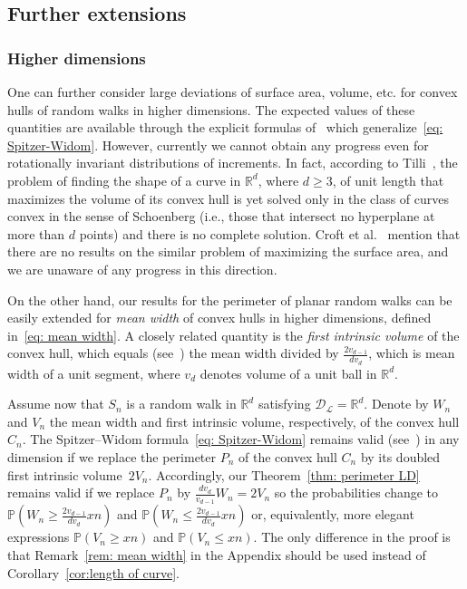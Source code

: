 \documentclass[AHL,Unicode,published]{cedram}
\newcommand{\Rbb}{\mathbb{R}}
\newcommand{\Pbb}{\mathbb{P}}
\newcommand{\Dcl}{\mathcal{D}}
\newcommand{\Lcl}{\mathcal{L}}
\begin{document}
\subsection{Further extensions} \label{sec: further}
\subsubsection{Higher dimensions}

One can further consider large deviations of surface area, volume, etc. for convex hulls of random walks in higher dimensions. The expected values of these quantities are available through the explicit formulas of~\cite[Section~4]{VysotskyZaporozhets} which generalize~\eqref{eq: Spitzer-Widom}. However, currently we cannot obtain any progress even for rotationally invariant distributions of increments. In fact, according to Tilli~\cite{Tilli}, the problem of finding the shape of a curve in $\Rbb^d$, where $d \ge 3$, of unit length that maximizes the volume of its convex hull is yet solved only in the class of curves convex in the sense of Schoenberg (i.e., those that intersect no hyperplane at more than $d$ points) and there is no complete solution. Croft et al.~\cite[Problem A28]{Croft+} mention that there are no results on the similar problem of maximizing the surface area, and we are unaware of any progress in this direction.

\begin{rema}\label{rem: thm mean width}
On the other hand, our results for the perimeter of planar random walks can be easily extended for \emph{mean width} of convex hulls in higher dimensions, defined in~\eqref{eq: mean width}. A closely related quantity is the \emph{first intrinsic volume} of the convex hull, which equals (see~\cite[Eq.~(14.7)]{SchneiderWeil}) the mean width divided by $\frac{2 v_{d-1}}{d v_d}$, which is mean width of a unit segment, where $v_d$ denotes volume of a unit ball in $\Rbb^d$.

Assume now that $S_n$ is a random walk in $\Rbb^d$ satisfying $\Dcl_{\Lcl} =\Rbb^d$. Denote by $W_n$ and $V_n$ the mean width and first intrinsic volume, respectively, of the convex hull $C_n$. The Spitzer--Widom formula~\eqref{eq: Spitzer-Widom} remains valid (see~\cite[Corollary~3]{VysotskyZaporozhets}) in any dimension if we replace the perimeter $P_n$ of the convex hull $C_n$ by its doubled first intrinsic volume~$2 V_n$. Accordingly, our Theorem~\ref{thm: perimeter LD} remains valid if we replace $P_n$ by $\frac{d v_d}{v_{d-1}} W_n = 2 V_n$ so the probabilities change to $\Pbb(W_n \ge \frac{2v_{d-1}}{d v_d} x n)$ and $\Pbb(W_n \le \frac{2v_{d-1}}{d v_d} x n)$ or, equivalently, more elegant expressions $\Pbb(V_n \ge x n)$ and $\Pbb(V_n \le x n)$. The only difference in the proof is that Remark~\ref{rem: mean width} in the Appendix should be used instead of Corollary~\ref{cor:length of curve}.
\end{rema}
\end{document}
